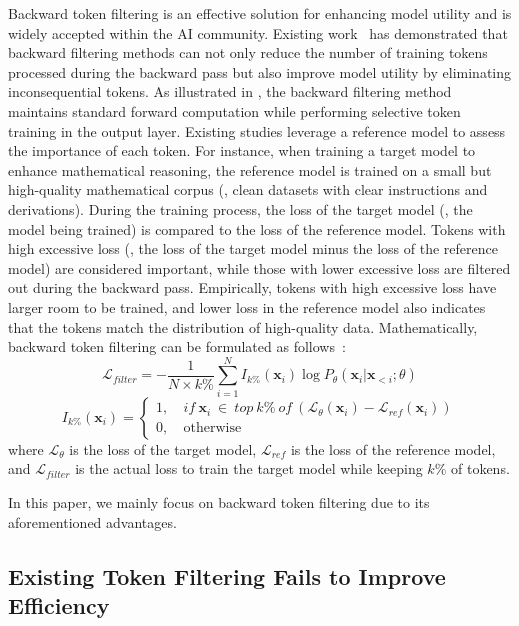 Backward token filtering is an effective solution for enhancing model utility and is widely accepted within the AI community. Existing work~\cite{RHO} has demonstrated that backward filtering methods can not only reduce the number of training tokens processed during the backward pass but also improve model utility by eliminating inconsequential tokens. As illustrated in , the backward filtering method maintains standard forward computation while performing selective token training in the output layer.
Existing studies leverage a reference model to assess the importance of each token. For instance, when training a target model to enhance mathematical reasoning, the reference model is trained on a small but high-quality mathematical corpus (\eg, clean datasets with clear instructions and derivations). During the training process, the loss of the target model (\ie, the model being trained) is compared to the loss of the reference model. Tokens with high excessive loss (\ie, the loss of the target model minus the loss of the reference model) are considered important, while those with lower excessive loss are filtered out during the backward pass.
Empirically, tokens with high excessive loss have larger room to be trained, and lower loss in the reference model also indicates that the tokens match the distribution of high-quality data. Mathematically, backward token filtering can be formulated as follows~\cite{RHO}:
\begin{equation}
    \mathcal{L}_{filter} = -\frac{1}{N \times k\%} \sum^N_{i=1} I_{k\%}(\mathbf{x}_i) \log P_{\theta}(\mathbf{x}_i|\mathbf{x}_{<i};\theta)
\end{equation}
\begin{equation}
	I_{k\%}(\mathbf{x}_i) = \left\{
	\begin{aligned}
		1, & \ if \ \mathbf{x}_i \ \in \ top \ k\% \ of \ (\mathcal{L}_{\theta}(\mathbf{x}_i)-\mathcal{L}_{ref}(\mathbf{x}_i)) \\
		0, & \ \text{otherwise}
	\end{aligned}
	\right.
\end{equation}
where $\mathcal{L}_{\theta}$ is the loss of the target model, $\mathcal{L}_{ref}$ is the loss of the reference model, and $\mathcal{L}_{filter}$ is the actual loss to train the target model while keeping $k\%$ of tokens.

In this paper, we mainly focus on backward token filtering due to its aforementioned advantages.

\subsection{Existing Token Filtering Fails to Improve Efficiency} \label{sec:efficiency_motivation}

